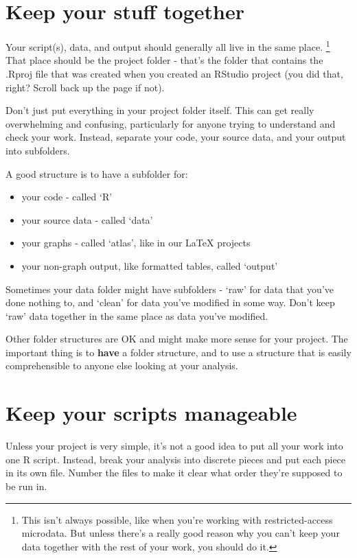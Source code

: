 \documentclass[
]{book}
\providecommand{\tightlist}{%
  \setlength{\itemsep}{0pt}\setlength{\parskip}{0pt}}
\begin{document}
\hypertarget{keep-your-stuff-together}{%
\section{Keep your stuff together}\label{keep-your-stuff-together}}

Your script(s), data, and output should generally all live in the same place. \footnote{This isn't always possible, like when you're working with restricted-access microdata. But unless there's a really good reason why you can't keep your data together with the rest of your work, you should do it.} That place should be the project folder - that's the folder that contains the .Rproj file that was created when you created an RStudio project (you did that, right? Scroll back up the page if not).

Don't just put everything in your project folder itself. This can get really overwhelming and confusing, particularly for anyone trying to understand and check your work. Instead, separate your code, your source data, and your output into subfolders.

A good structure is to have a subfolder for:

\begin{itemize}
\tightlist
\item
  your code - called `R'
\item
  your source data - called `data'
\item
  your graphs - called `atlas', like in our LaTeX projects
\item
  your non-graph output, like formatted tables, called `output'
\end{itemize}

Sometimes your data folder might have subfolders - `raw' for data that you've done nothing to, and `clean' for data you've modified in some way. Don't keep `raw' data together in the same place as data you've modified.

Other folder structures are OK and might make more sense for your project. The important thing is to \textbf{have} a folder structure, and to use a structure that is easily comprehensible to anyone else looking at your analysis.

\hypertarget{manageable}{%
\section{Keep your scripts manageable}\label{manageable}}

Unless your project is very simple, it's not a good idea to put all your work into one R script. Instead, break your analysis into discrete pieces and put each piece in its own file. Number the files to make it clear what order they're supposed to be run in.
\end{document}

